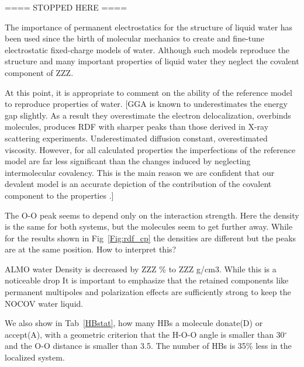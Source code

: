 \documentclass[prl,twocolumn,showpacs]{revtex4}
\begin{document}
==== STOPPED HERE ====

The importance of permanent electrostatics for the structure of liquid water has been used since the birth of molecular mechanics to create and fine-tune electrostatic fixed-charge models of water. Although such models reproduce the structure and many important properties of liquid water they neglect the covalent component of ZZZ.


At this point, it is appropriate to comment on the ability of the reference model to reproduce properties of water. [GGA is known to underestimates the energy gap slightly. As a result they overestimate the electron delocalization, overbinds molecules, produces RDF with sharper peaks than those derived in X-ray scattering experiments. Underestimated diffusion constant, overestimated viscosity. However, for all calculated properties the imperfections of the reference model are far less significant than the changes induced by neglecting intermolecular covalency. This is the main reason we are confident that our devalent model is an accurate depiction of the contribution of the covalent component to the properties .]

\new The O-O peak seems to depend only on the interaction strength. Here the density is the same for both systems, but the molecules seem to get further away. While for the results shown in Fig~\ref{Fig:rdf_cp} the densities are different but the peaks are at the same position. How to interpret this? \old

ALMO water Density is decreased by ZZZ \% to ZZZ g/cm3. While this is a noticeable drop It is important to emphasize that the retained components like permanent multipoles and polarization effects are sufficiently strong to keep the NOCOV water liquid. 

We also show in Tab~\ref{HBstat}, how many HBs a molecule donate(D) or accept(A), with a geometric criterion that the H-O-O angle is smaller than 30$^{\circ}$ and the O-O distance is smaller than 3.5\Ang. The number of HBs is 35\% less in the localized system.
\end{document}
